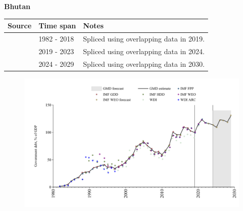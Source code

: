 \documentclass[12pt,a4paper,landscape]{article}
\begin{document}
\begin{adjustbox}{max totalsize={\paperwidth}{\paperheight},center}
\begin{minipage}[t][\textheight][t]{\textwidth}
\vspace*{0.5cm}
{}
\begin{center}
{\Large\bfseries Bhutan}
\end{center}
\vspace{0.5cm}
\begin{table}[H]
\centering
\small
\begin{tabular}{|l|l|l|}
\hline
\textbf{Source} & \textbf{Time span} & \textbf{Notes} \\
\hline
\rowcolor{white}\cite{IMF_GDD}& 1982 - 2018 &Spliced using overlapping data in 2019.\\
\rowcolor{lightgray}\cite{IMF_FPP}& 2019 - 2023 &Spliced using overlapping data in 2024.\\
\rowcolor{white}\cite{IMF_WEO_forecast}& 2024 - 2029 &Spliced using overlapping data in 2030.\\
\hline
\end{tabular}
\end{table}
\begin{figure}[H]
\centering
\includegraphics[width=\textwidth,height=0.6\textheight,keepaspectratio]{graphs/BTN_govdebt_GDP.pdf}
\end{figure}
\end{minipage}
\end{adjustbox}
\end{document}
